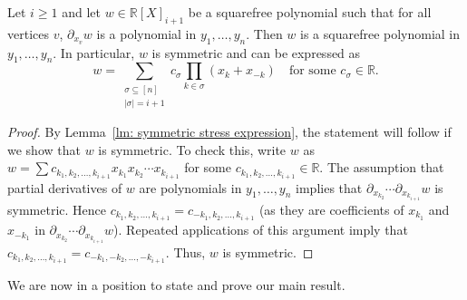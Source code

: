 \documentclass[ALCO,ThmDefs,Unicode,epreuves]{cedram}
\newcommand{\R}{\mathbb{R}{}}
\begin{document}
\begin{lemma}\label{lm: i-stress to i+1-stress}
Let $i\geq 1$ and let $w\in \R[X]_{i+1}$ be a squarefree polynomial such that for all vertices $v$, $\partial_{x_v} w$ is a polynomial in $y_1,\ldots,y_n$. Then $w$ is a squarefree polynomial in $y_1,\ldots,y_n$. In particular, $w$ is symmetric and can be expressed as $$w=\sum_{\substack{\sigma\subseteq [n]\\|\sigma|=i+1}} c_\sigma \prod_{k\in \sigma} (x_k+x_{-k}) \quad \mbox{for some }c_\sigma\in\R.$$
\end{lemma}
\begin{proof}
By Lemma~\ref{lm: symmetric stress expression}, the statement will follow if we show that $w$ is symmetric. To check this, write $w$ as $w=\sum c_{k_1,k_2,\ldots,k_{i+1}} x_{k_1}x_{k_2}\cdots x_{k_{i+1}}$ for some $c_{k_1,k_2,\ldots,k_{i+1}}\in \R$. The assumption that partial derivatives of $w$ are polynomials in $y_1,\ldots,y_n$ implies that $\partial_{x_{k_2}}\cdots \partial_{x_{k_{i+1}}} w$ is symmetric. Hence $c_{k_1,k_2,\ldots,k_{i+1}}= c_{-k_1,k_2,\ldots,k_{i+1}}$ (as they are coefficients of $x_{k_1}$ and $x_{-k_1}$ in $\partial_{x_{k_2}}\cdots \partial_{x_{k_{i+1}}} w$). Repeated applications of this argument imply that $c_{k_1,k_2,\ldots,k_{i+1}}= c_{-k_1,-k_2,\ldots,-k_{i+1}}$. Thus, $w$ is symmetric.
\end{proof}


We are now in a position to state and prove our main result.
\end{document}
